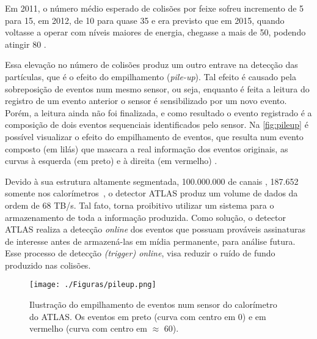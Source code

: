 
Em 2011, o número médio esperado de colisões por feixe sofreu incremento de 5 para 15, em 2012, de 10 para quase 35 e era previsto que em 2015, quando voltasse a operar com níveis maiores de energia, chegasse a mais de 50, podendo atingir 80 \cite{marshall2014}.

Essa elevação no número de colisões produz um outro entrave na detecção das partículas, que é o efeito do empilhamento (\textit{pile-up}). Tal efeito é causado pela sobreposição de eventos num mesmo sensor, ou seja, enquanto é feita a leitura do registro de um evento anterior o sensor é sensibilizado por um novo evento. Porém, a leitura ainda não foi finalizada, e como resultado o evento registrado é a composição de dois eventos sequenciais identificados pelo sensor. Na \autoref{fig:pileup} é possível visualizar o efeito do empilhamento de eventos, que resulta num evento composto (em lilás) que mascara a real informação dos eventos originais, as curvas à esquerda (em preto) e à direita (em vermelho) \cite{luz2016}.


Devido à sua estrutura altamente segmentada, 100.000.000 de canais \cite{atlas2010}, 187.652 somente nos calorímetros~\cite{ATLAS2008}, o detector ATLAS produz um volume de dados da ordem de 68 TB/s. Tal fato, torna proibitivo utilizar um sistema para o armazenamento de toda a informação produzida. Como solução, o detector ATLAS realiza a detecção \emph{online} dos eventos que possuam prováveis assinaturas de interesse antes de armazená-las em mídia permanente, para análise futura. Esse processo de detecção \textit{(trigger) online}, visa reduzir o ruído de fundo produzido nas colisões.

\begin{figure}[H]
	\begin{center}         
		\caption{Ilustração do empilhamento de eventos num sensor do calorímetro do ATLAS. Os eventos em preto (curva com centro em 0) e em vermelho (curva com centro em $\approx$ 60).}
		\texttt{[image: ./Figuras/pileup.png]}
		\label{fig:pileup}
	\end{center}
\end{figure}



